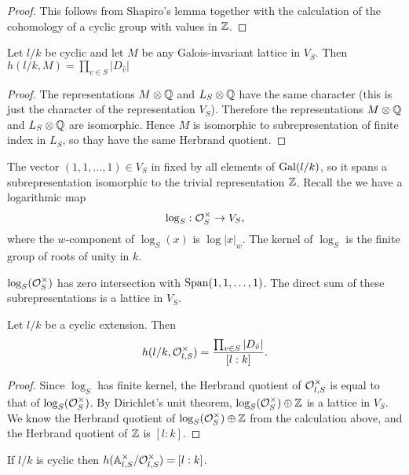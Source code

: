 \begin{proof}
	This follows from Shapiro's lemma together with
	the calculation of the cohomology of a cyclic group with values in ${\mathbb Z}$.
\end{proof}

\begin{lemma}
	Let $l/k$ be cyclic and let $M$ be any Galois-invariant lattice in $V_S$.
	Then $h(l/k,M) = \prod_{v \in S} |D_{\hat v}|$
\end{lemma}

\begin{proof}
	The representations $M \otimes {\mathbb Q}$ and $L_S \otimes {\mathbb Q}$ have the same character
	(this is just the character of the representation $V_S$).
	Therefore the representations $M \otimes {\mathbb Q}$ and $L_S \otimes {\mathbb Q}$ are isomorphic.
	Hence $M$ is isomorphic to subrepresentation of finite index in $L_S$,
	so thay have the same Herbrand quotient.
\end{proof}


The vector $(1,1,\ldots,1) \in V_S$ in fixed by all elements of $\mathrm{Gal}(l/k)$, so it spans
a subrepresentation isomorphic to the trivial representation ${\mathbb Z}$.
Recall the we have a logarithmic map
\[
	\log_S : {\mathcal O}_S^\times \to V_S,
\]
where the $w$-component of $\log_S(x)$ is $\log |x|_w$.
The kernel of $\log_S$ is the finite group of roots of unity in $k$.

\begin{theorem} \label{thm:Dirichlet unit theorem}
	$\log_S({\mathcal O}_S^\times)$ has zero intersection with $\mathrm{Span} (1,1,\ldots,1)$.
	The direct sum of these subrepresentations is a lattice in $V_S$.
\end{theorem}

\begin{corollary}
	Let $l/k$ be a cyclic extension. Then
	\[
		h(l/k,{\mathcal O}_{l,S}^\times) = \frac{\prod_{v\in S} |D_{\hat v}|}{[l:k]}.
	\]
\end{corollary}

\begin{proof}
	Since $\log_S$ has finite kernel, the Herbrand quotient of ${\mathcal O}_{l,S}^\times$ is
	equal to that of $\log_S({\mathcal O}_S^\times)$.
	By Dirichlet's unit theorem, $\log_S({\mathcal O}_S^\times) \oplus {\mathbb Z}$ is a lattice in
	$V_S$.
	We know the Herbrand quotient of $\log_S({\mathcal O}_S^\times) \oplus {\mathbb Z}$ from the calculation above,
	and the Herbrand quotient of ${\mathbb Z}$ is $[l:k]$.
\end{proof}

\begin{corollary}
	If $l/k$ is cyclic then $h({\mathbb A}_{l,S}^\times / {\mathcal O}_{l,S}^\times) = [l:k]$.
\end{corollary}



